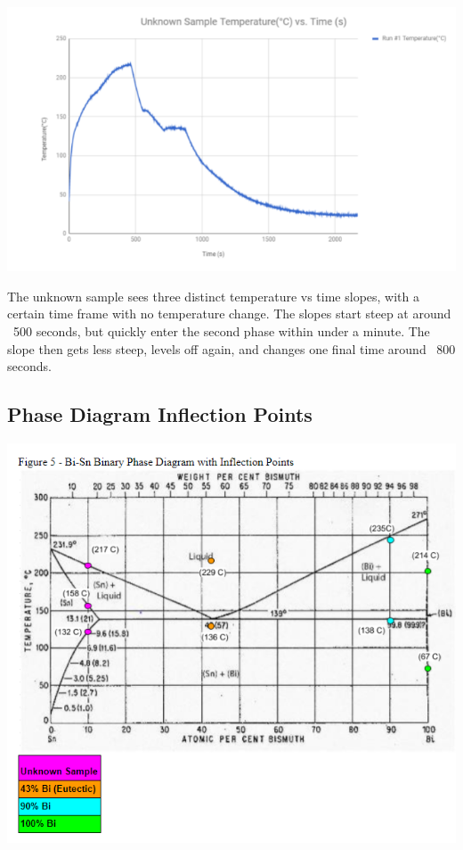 \documentclass{article}
\begin{document}
\begin{center}
\includegraphics[width=400pt]{UnknownSample_Graph.png}
\end{center}
The unknown sample sees three distinct temperature vs time slopes, with a certain time frame with no temperature change. The slopes start steep at around ~500 seconds, but quickly enter the second phase within under a minute. The slope then gets less steep, levels off again, and changes one final time around ~800 seconds. 

\subsection{Phase Diagram Inflection Points}

\begin{center}
\includegraphics[width=400pt]{PhaseDiagram.png}
\end{center}
\end{document}

